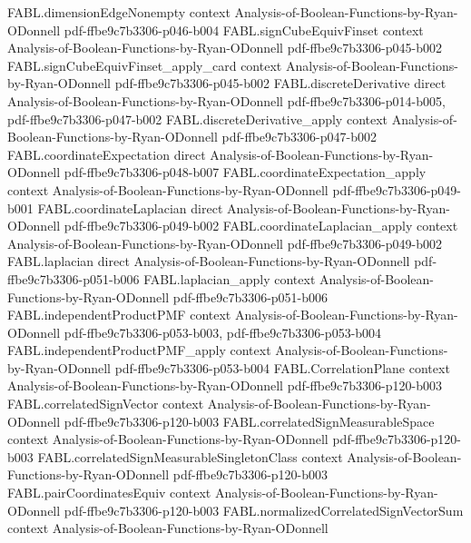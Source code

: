 \begin{theorem}
\proofstep
  {FABL.dimensionEdgeNonempty}
  {context}
  {Analysis-of-Boolean-Functions-by-Ryan-ODonnell}
  {pdf-ffbe9c7b3306-p046-b004}
\proofstep
  {FABL.signCubeEquivFinset}
  {context}
  {Analysis-of-Boolean-Functions-by-Ryan-ODonnell}
  {pdf-ffbe9c7b3306-p045-b002}
\proofstep
  {FABL.signCubeEquivFinset_apply_card}
  {context}
  {Analysis-of-Boolean-Functions-by-Ryan-ODonnell}
  {pdf-ffbe9c7b3306-p045-b002}
\proofstep
  {FABL.discreteDerivative}
  {direct}
  {Analysis-of-Boolean-Functions-by-Ryan-ODonnell}
  {pdf-ffbe9c7b3306-p014-b005,
    pdf-ffbe9c7b3306-p047-b002}
\proofstep
  {FABL.discreteDerivative_apply}
  {context}
  {Analysis-of-Boolean-Functions-by-Ryan-ODonnell}
  {pdf-ffbe9c7b3306-p047-b002}
\proofstep
  {FABL.coordinateExpectation}
  {direct}
  {Analysis-of-Boolean-Functions-by-Ryan-ODonnell}
  {pdf-ffbe9c7b3306-p048-b007}
\proofstep
  {FABL.coordinateExpectation_apply}
  {context}
  {Analysis-of-Boolean-Functions-by-Ryan-ODonnell}
  {pdf-ffbe9c7b3306-p049-b001}
\proofstep
  {FABL.coordinateLaplacian}
  {direct}
  {Analysis-of-Boolean-Functions-by-Ryan-ODonnell}
  {pdf-ffbe9c7b3306-p049-b002}
\proofstep
  {FABL.coordinateLaplacian_apply}
  {context}
  {Analysis-of-Boolean-Functions-by-Ryan-ODonnell}
  {pdf-ffbe9c7b3306-p049-b002}
\proofstep
  {FABL.laplacian}
  {direct}
  {Analysis-of-Boolean-Functions-by-Ryan-ODonnell}
  {pdf-ffbe9c7b3306-p051-b006}
\proofstep
  {FABL.laplacian_apply}
  {context}
  {Analysis-of-Boolean-Functions-by-Ryan-ODonnell}
  {pdf-ffbe9c7b3306-p051-b006}
\proofstep
  {FABL.independentProductPMF}
  {context}
  {Analysis-of-Boolean-Functions-by-Ryan-ODonnell}
  {pdf-ffbe9c7b3306-p053-b003,
    pdf-ffbe9c7b3306-p053-b004}
\proofstep
  {FABL.independentProductPMF_apply}
  {context}
  {Analysis-of-Boolean-Functions-by-Ryan-ODonnell}
  {pdf-ffbe9c7b3306-p053-b004}
\proofstep
  {FABL.CorrelationPlane}
  {context}
  {Analysis-of-Boolean-Functions-by-Ryan-ODonnell}
  {pdf-ffbe9c7b3306-p120-b003}
\proofstep
  {FABL.correlatedSignVector}
  {context}
  {Analysis-of-Boolean-Functions-by-Ryan-ODonnell}
  {pdf-ffbe9c7b3306-p120-b003}
\proofstep
  {FABL.correlatedSignMeasurableSpace}
  {context}
  {Analysis-of-Boolean-Functions-by-Ryan-ODonnell}
  {pdf-ffbe9c7b3306-p120-b003}
\proofstep
  {FABL.correlatedSignMeasurableSingletonClass}
  {context}
  {Analysis-of-Boolean-Functions-by-Ryan-ODonnell}
  {pdf-ffbe9c7b3306-p120-b003}
\proofstep
  {FABL.pairCoordinatesEquiv}
  {context}
  {Analysis-of-Boolean-Functions-by-Ryan-ODonnell}
  {pdf-ffbe9c7b3306-p120-b003}
\proofstep
  {FABL.normalizedCorrelatedSignVectorSum}
  {context}
  {Analysis-of-Boolean-Functions-by-Ryan-ODonnell}

\end{theorem}
